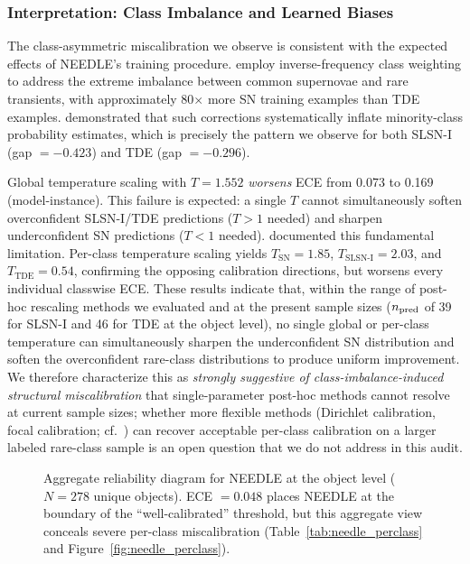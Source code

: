 \documentclass[twocolumn]{aastex631}
\begin{document}
\subsubsection{Interpretation: Class Imbalance and Learned Biases} \label{sec:needle_interp}

The class-asymmetric miscalibration we observe is consistent with the expected effects of NEEDLE's training procedure. \citet{sheng2024} employ inverse-frequency class weighting to address the extreme imbalance between common supernovae and rare transients, with approximately 80$\times$ more SN training examples than TDE examples. \citet{vandengoorbergh2022} demonstrated that such corrections systematically inflate minority-class probability estimates, which is precisely the pattern we observe for both SLSN-I (gap $= -0.423$) and TDE (gap $= -0.296$).

Global temperature scaling with $T = 1.552$ \emph{worsens} ECE from 0.073 to 0.169 (model-instance). This failure is expected: a single $T$ cannot simultaneously soften overconfident SLSN-I/TDE predictions ($T > 1$ needed) and sharpen underconfident SN predictions ($T < 1$ needed). \citet{kull2019} documented this fundamental limitation. Per-class temperature scaling yields $T_{\text{SN}} = 1.85$, $T_{\text{SLSN-I}} = 2.03$, and $T_{\text{TDE}} = 0.54$, confirming the opposing calibration directions, but worsens every individual classwise ECE. These results indicate that, within the range of post-hoc rescaling methods we evaluated and at the present sample sizes ($n_{\rm pred}$ of 39 for SLSN-I and 46 for TDE at the object level), no single global or per-class temperature can simultaneously sharpen the underconfident SN distribution and soften the overconfident rare-class distributions to produce uniform improvement. We therefore characterize this as \textit{strongly suggestive of class-imbalance-induced structural miscalibration} that single-parameter post-hoc methods cannot resolve at current sample sizes; whether more flexible methods (Dirichlet calibration, focal calibration; cf.\ \citealt{kull2019, mukhoti2020}) can recover acceptable per-class calibration on a larger labeled rare-class sample is an open question that we do not address in this audit.

\begin{figure}
\caption{Aggregate reliability diagram for NEEDLE at the object level ($N = 278$ unique objects). ECE $= 0.048$ places NEEDLE at the boundary of the ``well-calibrated'' threshold, but this aggregate view conceals severe per-class miscalibration (Table~\ref{tab:needle_perclass} and Figure~\ref{fig:needle_perclass}). \label{fig:needle_aggregate}}
\end{figure}
\end{document}

